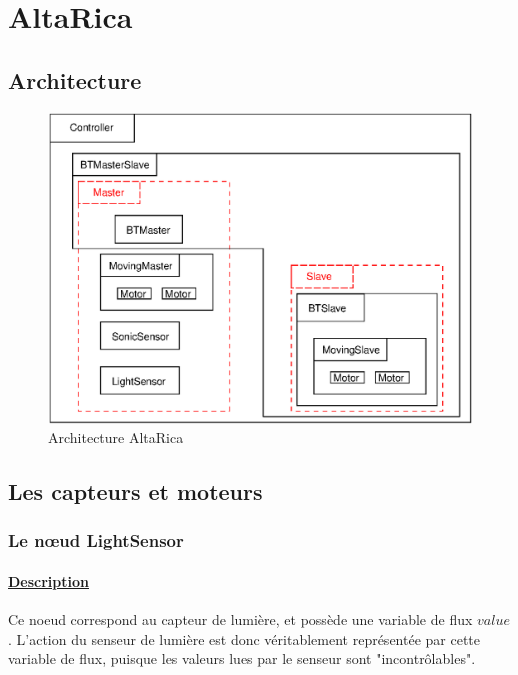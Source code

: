  \section{AltaRica}

  \subsection{Architecture}
  \begin{figure}[!ht]
   \begin{center}
    \includegraphics{ARmodel.eps}
    \caption{Architecture AltaRica}
   \end{center}
  \end{figure}

  \subsection{Les capteurs et moteurs}
    
   \subsubsection{Le n\oe{}ud LightSensor}

    \paragraph{\underline{Description\\}}
    Ce noeud correspond au capteur de lumière, et possède une variable 
    de flux $value$. L'action du senseur de lumière est donc véritablement 
    représentée par cette variable de flux, puisque les valeurs lues par
     le senseur sont "incontrôlables".

